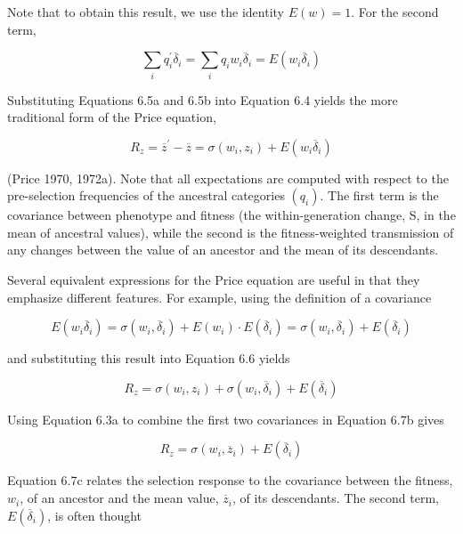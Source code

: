 \documentclass{article}
\begin{document}
Note that to obtain this result, we use the identity  $ E(w) = 1 $. For the second term,

\begin{equation}
\sum_{i}q_{i}^{\prime}\overline{\delta}_{i}=\sum_{i}q_{i}w_{i}\overline{\delta}_{i}=E(w_{i}\overline{\delta}_{i})
\tag{6.5b}
\label{eq:6_5b}
\end{equation}

Substituting Equations 6.5a and 6.5b into Equation 6.4 yields the more traditional form of the Price equation,

\begin{equation}
R_{z}=\overline{z}^{\prime}-\overline{z}=\sigma(w_{i},z_{i})+E(w_{i}\overline{\delta}_{i})
\tag{6.6}
\label{eq:6_6}
\end{equation}

(Price 1970, 1972a). Note that all expectations are computed with respect to the pre-selection frequencies of the ancestral categories  $ (q_{i}) $. The first term is the covariance between phenotype and fitness (the within-generation change, S, in the mean of ancestral values), while the second is the fitness-weighted transmission of any changes between the value of an ancestor and the mean of its descendants.

Several equivalent expressions for the Price equation are useful in that they emphasize different features. For example, using the definition of a covariance

\begin{equation}
E(w_{i}\overline{\delta}_{i})=\sigma(w_{i},\overline{\delta}_{i})+E(w_{i})\cdot E(\overline{\delta}_{i})=\sigma(w_{i},\overline{\delta}_{i})+E(\overline{\delta}_{i})
\tag{6.7a}
\label{eq:6_7a}
\end{equation}

and substituting this result into Equation 6.6 yields

\begin{equation}
R_{z}=\sigma(w_{i},z_{i})+\sigma(w_{i},\overline{\delta}_{i})+E(\overline{\delta}_{i})
\tag{6.7b}
\label{eq:6_7b}
\end{equation}

Using Equation 6.3a to combine the first two covariances in Equation 6.7b gives

\begin{equation}
R_{z}=\sigma(w_{i},\overline{z}_{i})+E(\overline{\delta}_{i})
\tag{6.7c}
\label{eq:6_7c}
\end{equation}

Equation 6.7c relates the selection response to the covariance between the fitness,  $ w_i $, of an ancestor and the mean value,  $ \overline{z}_i $, of its descendants. The second term,  $ E(\overline{\delta}_i) $, is often thought
\end{document}
